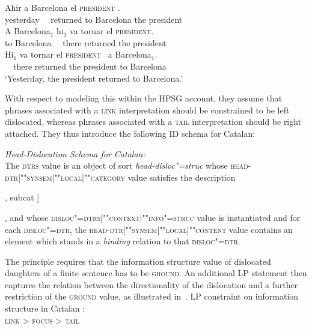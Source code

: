 \documentclass[output=paper]{langsci/langscibook}
\begin{document}
\begin{exe}
  \ex\label{ex:catalan}
  \begin{xlist}
    \ex\gll Ahir  a Barcelona el \textsc{president} \RF.\\
         yesterday \ \ returned to Barcelona the president\\
   \ex\gll  A Barcelona$_1$ \LF hi$_1$ {va tornar} el \textsc{president}\RF.\\
           to Barcelona \ \  there returned the president\\\label{ex:catalan-a}
           \ex\gll \LF Hi$_1$ {va tornar} el \textsc{president}\RF\ {} a Barcelona$_1$.\\
            \ \  there  returned the president to Barcelona\\\label{ex:catalan-b}
\trans `Yesterday, the president returned to Barcelona.'
  \end{xlist}
\end{exe}
 
With respect to modeling this within the HPSG account, they assume
that phrases associated with a \textsc{link} interpretation should be
constrained to be left dislocated, whereas phrases associated with a
\textsc{tail} interpretation should be right attached.
They thus introduce the following ID schema for Catalan:
\begin{sloppy}
\begin{exe}
\ex  \textit{Head-Dislocation Schema for Catalan:}\\
  The \textsc{dtrs} value is an object of sort
  \textit{head-disloc"=struc} whose
  \textsc{head-dtr|""syn\-sem|""local|""category} value satisfies the
  description\\
  \begin{avm} [head \type{verb} [vform \type{finite}], subcat \elst]
  \end{avm}, and whose
  \textsc{disloc"=dtrs|""context|""info"=struc} value is instantiated and
  for each \textsc{disloc"=dtr}, the
  \textsc{head-dtr|""synsem|""local|""content} value contains an element
  which stands in a \textit{binding} relation to that
  \textsc{disloc"=dtr}.
\end{exe}
\end{sloppy}

The principle requires that the information structure value of
dislocated daughters of a finite sentence has to be
\textsc{ground}. An additional LP statement then captures the relation
between the directionality of the dislocation and a further
restriction of the \textsc{ground} value, as illustrated in~.
\ea
LP constraint on information structure in Catalan  \citep{EV96a}:\\
  \centering
  \textsc{link} > \textsc{focus} > \textsc{tail}
\end{document}
